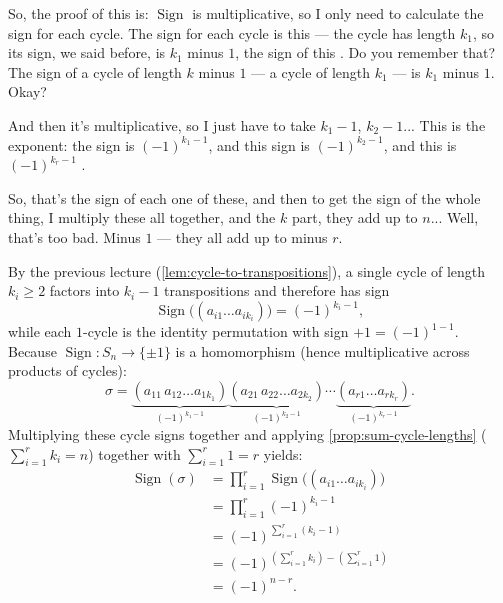 \begin{proofWrapper}

\begin{speech}[00:41:00 - 00:42:08]
So, the proof of this is: $\operatorname{Sign}$ is multiplicative, so I only need to calculate the sign for each cycle. The sign for each cycle is this --- the cycle has length $k_1$, so its sign, we said before, is $k_1$ minus $1$, the sign of this . Do you remember that? The sign of a cycle of length $k$ minus $1$ --- a cycle of length $k_1$ --- is $k_1$ minus $1$. Okay?

And then it's multiplicative, so I just have to take $k_1 - 1$, $k_2 - 1$... This is the exponent: the sign is $(-1)^{k_1 - 1}$, and this sign is $(-1)^{k_2 - 1}$, and this is $(-1)^{k_r - 1}$ .

So, that's the sign of each one of these, and then to get the sign of the whole thing, I multiply these all together, and the $k$ part, they add up to $n$... Well, that's too bad. Minus $1$ --- they all add up to minus $r$.
\end{speech}

\begin{content}
By the previous lecture (\cref{lem:cycle-to-transpositions}), a single cycle of length $k_i \ge 2$ factors into $k_i - 1$ transpositions and therefore has sign
\begin{equation}\label{eq:sign-single-cycle}
\operatorname{Sign}\bigl((a_{i1} \dots a_{i k_i})\bigr) = (-1)^{k_i - 1},
\end{equation}
while each $1$-cycle is the identity permutation with sign $+1 = (-1)^{1 - 1}$. Because $\operatorname{Sign} \colon S_n \to \{\pm 1\}$ is a homomorphism (hence multiplicative across products of cycles):
\[
\sigma = \underbrace{(a_{11}\, a_{12} \dots a_{1 k_1})}_{(-1)^{k_1 - 1}} \underbrace{(a_{21}\, a_{22} \dots a_{2 k_2})}_{(-1)^{k_2 - 1}} \cdots \underbrace{(a_{r1} \dots a_{r k_r})}_{(-1)^{k_r - 1}}.
\]
Multiplying these cycle signs together and applying \cref{prop:sum-cycle-lengths} ($\sum_{i=1}^r k_i = n$) together with $\sum_{i=1}^r 1 = r$ yields:
\begin{align*}
\operatorname{Sign}(\sigma) &= \prod_{i=1}^r \operatorname{Sign}\bigl((a_{i1} \dots a_{i k_i})\bigr) \\
&= \prod_{i=1}^r (-1)^{k_i - 1} \\
&= (-1)^{\sum_{i=1}^r (k_i - 1)} \\
&= (-1)^{\left(\sum_{i=1}^r k_i\right) - \left(\sum_{i=1}^r 1\right)} \\
&= (-1)^{n - r}.
\end{align*}
\end{content}

\end{proofWrapper}


